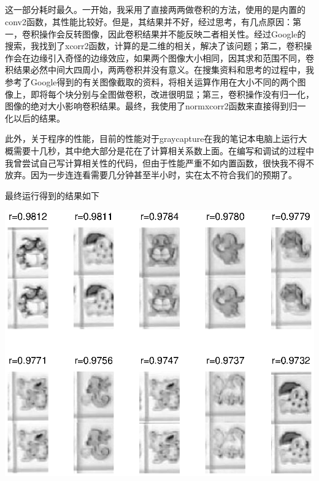 \subsection{}
\noindent{}
\par 这一部分耗时最久。一开始，我采用了直接两两做卷积的方法，使用的是内置的conv2函数，其性能比较好。但是，其结果并不好，经过思考，有几点原因：第一，卷积操作会反转图像，因此卷积结果并不能反映二者相关性。经过Google的搜索，我找到了xcorr2函数，计算的是二维的相关，解决了该问题；第二，卷积操作会在边缘引入奇怪的边缘效应，如果两个图像大小相同，因其求和范围不同，卷积结果必然中间大四周小，两两卷积并没有意义。在搜集资料和思考的过程中，我参考了Google得到的有关图像截取的资料，将相关运算作用在大小不同的两个图像上，即将每个块分别与全图做卷积，改进很明显；第三，卷积操作没有归一化，图像的绝对大小影响卷积结果。最终，我使用了normxcorr2函数来直接得到归一化以后的结果。
\par 此外，关于程序的性能，目前的性能对于graycapture在我的笔记本电脑上运行大概需要十几秒，其中绝大部分是花在了计算相关系数上面。在编写和调试的过程中我曾尝试自己写计算相关性的代码，但由于性能严重不如内置函数，很快我不得不放弃。因为一步连连看需要几分钟甚至半小时，实在太不符合我们的预期了。
\par 最终运行得到的结果如下
\par \begin{center}\includegraphics[width=\textwidth]{A4_2_3.eps}\end{center}

